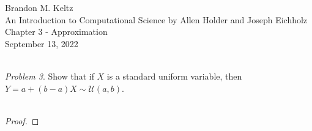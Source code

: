 \documentclass{article}
\begin{document}
	\begin{flushleft}

		Brandon M. Keltz\\
		An Introduction to Computational Science by Allen Holder and Joseph Eichholz\\
		Chapter 3 - Approximation\\
		September 13, 2022\\\

		\textit{Problem 3}. Show that if $X$ is a standard uniform variable, then $Y = a + \left( b - a \right) X \sim \mathcal{U} \left( a, b \right)$. \\\

		\begin{proof}

			

		\end{proof}

	\end{flushleft}
\end{document}
